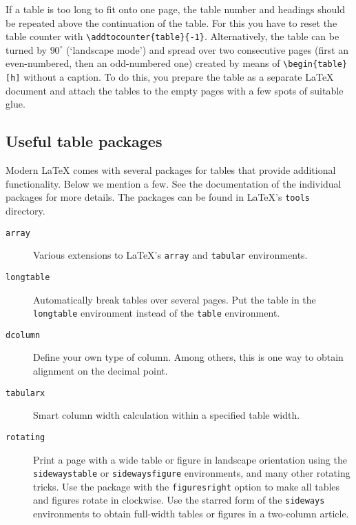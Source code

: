 \documentclass[fleqn,twoside]{article}
\begin{document}
If a table is too long to fit onto one page, the table number and
headings should be repeated above the continuation of the table. For
this you have to reset the table counter with
\verb|\addtocounter{table}{-1}|. Alternatively, the table can be turned
by $90^\circ$ (`landscape mode') and spread over two consecutive pages
(first an even-numbered, then an odd-numbered one) created by means of
\verb|\begin{table}[h]| without a caption. To do this, you prepare the
table as a separate \LaTeX{} document and attach the tables to the
empty pages with a few spots of suitable glue.

\subsection{Useful table packages}

Modern \LaTeX{} comes with several packages for tables that
provide additional functionality. Below we mention a few. See
the documentation of the individual packages for more details. The
packages can be found in \LaTeX's \texttt{tools} directory.

\begin{description}
  
\item[\texttt{array}] Various extensions to \LaTeX's \texttt{array}
  and \texttt{tabular} environments.
  
\item[\texttt{longtable}] Automatically break tables over several
  pages. Put the table in the \texttt{longtable} environment instead
  of the \texttt{table} environment.
  
\item [\texttt{dcolumn}] Define your own type of column. Among others,
  this is one way to obtain alignment on the decimal point.

\item[\texttt{tabularx}] Smart column width calculation within a
  specified table width.
  
\item[\texttt{rotating}] Print a page with a wide table or figure in
  landscape orientation using the \texttt{sidewaystable} or
  \texttt{sidewaysfigure} environments, and many other rotating
  tricks. Use the package with the \texttt{figuresright} option to
  make all tables and figures rotate in clockwise. Use the starred
  form of the \texttt{sideways} environments to obtain full-width
  tables or figures in a two-column article.

\end{description}
\end{document}

